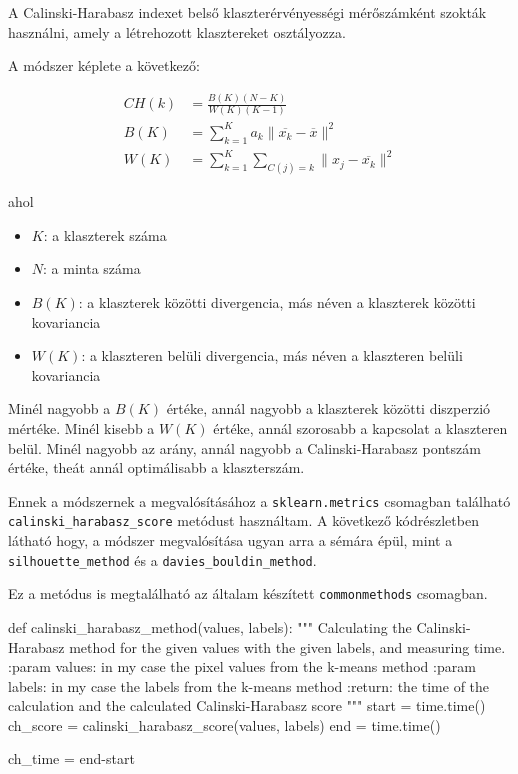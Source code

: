 
A Calinski-Harabasz indexet belső klaszterérvényességi mérőszámként szokták használni, amely a létrehozott klasztereket osztályozza.

A módszer képlete a következő:

\begin{align*}
 CH(k) & =\frac{B(K)(N-K)}{W(K)(K-1)} \\
 B(K) & =\sum_{k=1}^{K}a_k \|\overline{x_k}-\overline{x}\|^2 \\
 W(K) & =\sum_{k=1}^{K}\sum_{C(j)=k}\|x_j-\overline{x_k}\|^2
\end{align*}

\noindent ahol
\begin{itemize}
\item $K$: a klaszterek száma
\item $N$: a minta száma
\item $B(K)$: a klaszterek közötti divergencia, más néven a klaszterek közötti kovariancia
\item $W(K)$: a klaszteren belüli divergencia, más néven a klaszteren belüli kovariancia
\end{itemize}

Minél nagyobb a $B(K)$ értéke, annál nagyobb a klaszterek közötti diszperzió mértéke. Minél kisebb a $W(K)$ értéke, annál szorosabb a kapcsolat a klaszteren belül. Minél nagyobb az arány, annál nagyobb a Calinski-Harabasz pontszám értéke, theát annál optimálisabb a klaszterszám. \cite{silhouette_calinski}

Ennek a módszernek a megvalósításához a \texttt{sklearn.metrics} csomagban található \texttt{calinski\_harabasz\_score} metódust használtam. A következő kódrészletben látható hogy, a módszer megvalósítása ugyan arra a sémára épül, mint a \texttt{silhouette\_method} és a \texttt{davies\_bouldin\_method}.

Ez a metódus is megtalálható az általam készített \texttt{commonmethods} csomagban.
\begin{python}
def calinski_harabasz_method(values, labels):
    """
    Calculating the Calinski-Harabasz method for the given values with
    the given labels, and measuring time.
    :param values: in my case the pixel values from the k-means method
    :param labels: in my case the labels from the k-means method
    :return: the time of the calculation and
        the calculated Calinski-Harabasz score
    """
    start = time.time()
    ch_score = calinski_harabasz_score(values, labels)
    end = time.time()

    ch_time = end-start
\end{python}

